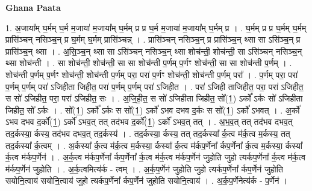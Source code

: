 \documentclass[17pt]{extarticle}
\begin{document}
\textbf{Ghana Paata } \newline

1. अ॒जाया᳚म् घ॒र्मम् घ॒र्म म॒जाया॑ म॒जाया᳚म् घ॒र्मम् प्र प्र घ॒र्म म॒जाया॑ म॒जाया᳚म् घ॒र्मम् प्र । . घ॒र्मम् प्र प्र घ॒र्मम् घ॒र्मम् प्रासि॑ञ्चन् नसिञ्च॒न् प्र घ॒र्मम् घ॒र्मम् प्रासि॑ञ्चन्न् । . प्रासि॑ञ्चन् नसिञ्च॒न् प्र प्रासि॑ञ्च॒न् थ्सा सा ऽसि॑ञ्च॒न् प्र प्रासि॑ञ्च॒न् थ्सा । . अ॒सि॒ञ्च॒न् थ्सा सा ऽसि॑ञ्चन् नसिञ्च॒न् थ्सा शोच॑न्ती॒ शोच॑न्ती॒ सा ऽसि॑ञ्चन् नसिञ्च॒न् थ्सा शोच॑न्ती । . सा शोच॑न्ती॒ शोच॑न्ती॒ सा सा शोच॑न्ती प॒र्णम् प॒र्णꣳ शोच॑न्ती॒ सा सा शोच॑न्ती प॒र्णम् । . शोच॑न्ती प॒र्णम् प॒र्णꣳ शोच॑न्ती॒ शोच॑न्ती प॒र्णम् परा॒ परा॑ प॒र्णꣳ शोच॑न्ती॒ शोच॑न्ती प॒र्णम् परा᳚ । . प॒र्णम् परा॒ परा॑ प॒र्णम् प॒र्णम् परा॑ ऽजिहीता जिहीत॒ परा॑ प॒र्णम् प॒र्णम् परा॑ ऽजिहीत । . परा॑ ऽजिही ताजिहीत॒ परा॒ परा॑ ऽजिहीत॒ स सो॑ ऽजिहीत॒ परा॒ परा॑ ऽजिहीत॒ सः । . अ॒जि॒ही॒त॒ स सो॑ ऽजिहीता जिहीत॒ सो᳚(1॒) ऽर्को᳚ ऽर्कः सो॑ ऽजिहीता जिहीत॒ सो᳚ ऽर्कः । . सो᳚(1॒) ऽर्को᳚ ऽर्कः स सो᳚(1॒) ऽर्को॑ ऽभव दभव द॒र्कः स सो᳚(1॒) ऽर्को॑ ऽभवत् । . अ॒र्को॑ ऽभव दभव द॒र्को᳚(1॒) ऽर्को॑ ऽभव॒त् तत् तद॑भव द॒र्को᳚(1॒) ऽर्को॑ ऽभव॒त् तत् । . अ॒भ॒व॒त् तत् तद॑भव दभव॒त् तद॒र्कस्या॒ र्कस्य॒ तद॑भव दभव॒त् तद॒र्कस्य॑ । . तद॒र्कस्या॒ र्कस्य॒ तत् तद॒र्कस्या᳚ र्क॒त्व म॑र्क॒त्व म॒र्कस्य॒ तत् तद॒र्कस्या᳚ र्क॒त्वम् । . अ॒र्कस्या᳚ र्क॒त्व म॑र्क॒त्व म॒र्कस्या॒ र्कस्या᳚ र्क॒त्व म॑र्कप॒र्णेना᳚ र्कप॒र्णेना᳚ र्क॒त्व म॒र्कस्या॒ र्कस्या᳚ र्क॒त्व म॑र्कप॒र्णेन॑ । . अ॒र्क॒त्व म॑र्कप॒र्णेना᳚ र्कप॒र्णेना᳚ र्क॒त्व म॑र्क॒त्व म॑र्कप॒र्णेन॑ जुहोति जुहो त्यर्कप॒र्णेना᳚ र्क॒त्व म॑र्क॒त्व म॑र्कप॒र्णेन॑ जुहोति । . अ॒र्क॒त्वमित्य॑र्क - त्वम् । . अ॒र्क॒प॒र्णेन॑ जुहोति जुहो त्यर्कप॒र्णेना᳚ र्कप॒र्णेन॑ जुहोति सयोनि॒त्वाय॑ सयोनि॒त्वाय॑ जुहो त्यर्कप॒र्णेना᳚ र्कप॒र्णेन॑ जुहोति सयोनि॒त्वाय॑ । . अ॒र्क॒प॒र्णेनेत्य॑र्क - प॒र्णेन॑ । \newline
\end{document}
